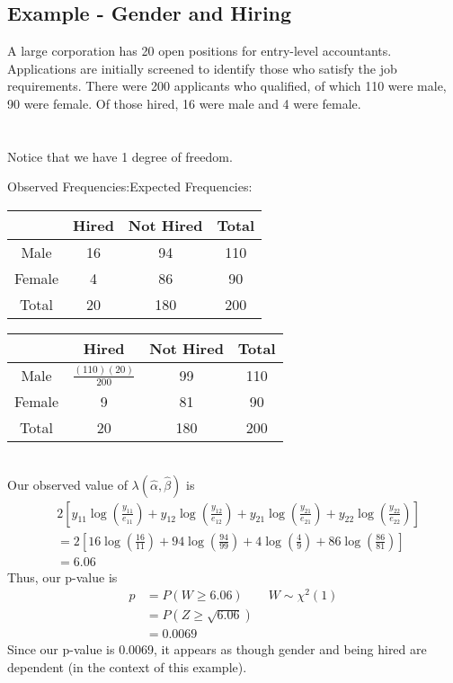 \documentclass[12pt]{article}
\begin{document}
\subsection{Example - Gender and Hiring}
A large corporation has 20 open positions for entry-level accountants.  Applications are initially screened to identify those who satisfy the job requirements.  There were 200 applicants who qualified, of which 110 were male, 90 were female.  Of those hired, 16 were male and 4 were female.\\
\\\\ Notice that we have 1 degree of freedom.

\noindent Observed Frequencies:\hfill Expected Frequencies:\\
\begin{tabular}{c|cc|c}
    & Hired & Not Hired & Total\\\hline
    Male & 16 & 94 & 110\\
    Female & 4 & 86 & 90\\\hline
    Total & 20 & 180 & 200
\end{tabular}\hfill
\begin{tabular}{c|cc|c}
    & Hired & Not Hired & Total\\\hline
    Male & $\frac{(110)(20)}{200}$ & 99 & 110\\
    Female & 9 & 81 & 90\\\hline
    Total & 20 & 180 & 200
\end{tabular}\\
Our observed value of $\lambda(\hat\alpha,\hat\beta)$ is
\begin{align*}
    &2\left[y_{11}\log\left(\frac{y_{11}}{e_{11}}\right)+y_{12}\log\left(\frac{y_{12}}{e_{12}}\right)+y_{21}\log\left(\frac{y_{21}}{e_{21}}\right)+y_{22}\log\left(\frac{y_{22}}{e_{22}}\right)\right]\\
    &=2\left[16\log\left(\frac{16}{11}\right)+94\log\left(\frac{94}{99}\right)+4\log\left(\frac{4}{9}\right)+86\log\left(\frac{86}{81}\right)\right]\\
    &=6.06
\end{align*}
Thus, our p-value is 
\begin{align*}
    p&=P(W\geq 6.06)\qquad W\sim\chi^2(1)\\
    &=P(Z\geq \sqrt{6.06})\\
    &=0.0069
\end{align*} 
Since our p-value is 0.0069, it appears as though gender and being hired are dependent (in the context of this example).
\end{document}
